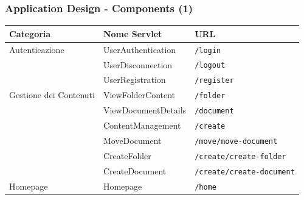 \documentclass[aspectratio=169, dvipsnames]{beamer}
\begin{document}
\begin{frame}
    \frametitle{Application Design - Components (1)}
    \begin{table}[h!]
        \centering
        \begin{tabular}{|l|l|l|}
            \hline
            \textbf{Categoria}     & \textbf{Nome Servlet} & \textbf{URL}                     \\ \hline
            Autenticazione         & UserAuthentication    & \texttt{/login}                  \\ \cline{2-3}
                                   & UserDisconnection     & \texttt{/logout}                 \\ \cline{2-3}
                                   & UserRegistration      & \texttt{/register}               \\
            \hline
            Gestione dei Contenuti & ViewFolderContent     & \texttt{/folder}                 \\ \cline{2-3}
                                   & ViewDocumentDetails   & \texttt{/document}               \\ \cline{2-3}
                                   & ContentManagement     & \texttt{/create}                 \\ \cline{2-3}
                                   & MoveDocument          & \texttt{/move/move-document}     \\ \cline{2-3}
                                   & CreateFolder          & \texttt{/create/create-folder}   \\ \cline{2-3}
                                   & CreateDocument        & \texttt{/create/create-document} \\
            \hline
            Homepage               & Homepage              & \texttt{/home}                   \\ \hline
        \end{tabular}
    \end{table}
\end{frame}
\end{document}
